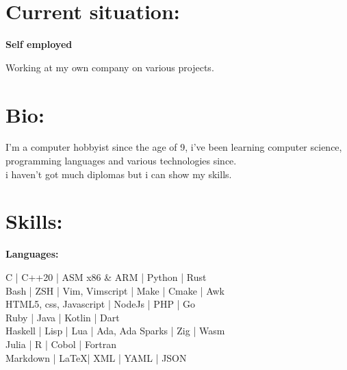 \documentclass[a4paper,10pt]{article}
\begin{document}
\begin{adjustbox}{valign=t}
\begin{minipage}{0.6\textwidth} %
\section*{Current situation:}
\begin{description}
\raggedright
\item[\normalfont \textcolor{ColorOne}{Sept. 2021 -- Now.}] \textbf{Self employed}\\ \medskip

Working at my own company on various projects.

\vspace{-0.9\baselineskip}
\end{description}

\section*{Bio:}
\begin{spacing}{1.0}

\vspace{-0.6\baselineskip}

\hspace{5mm} I'm a computer hobbyist since the age of 9, i've been learning computer science,
programming languages and various technologies since.\\
i haven't got much diplomas but i can show my skills.
\end{spacing}
\vspace{-0.8\baselineskip}
\section*{Skills:}
\begin{description}
\begin{spacing}{0.95}
\item{\textbf{Languages:}}

    C | C++20 | ASM x86 \& ARM | Python | Rust \\
    Bash | ZSH | Vim, Vimscript | Make | Cmake | Awk\\
    HTML5, css, Javascript | NodeJs | PHP | Go\\
    Ruby | Java | Kotlin | Dart\\
    Haskell | Lisp | Lua | Ada, Ada Sparks | Zig | Wasm\\
    Julia | R | Cobol | Fortran \\
    Markdown | \LaTeX | XML | YAML | JSON


\end{spacing}
\end{description}
\end{minipage}
\end{adjustbox}
\end{document}
